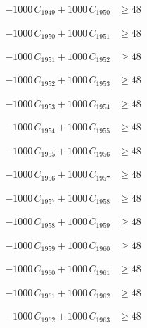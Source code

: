 \documentclass[a4paper,11pt]{article}
\begin{document}
\begin{align}
-1000\,C_{1949} + 1000\,C_{1950} &\geq 48 \nonumber
\end{align}

\begin{align}
-1000\,C_{1950} + 1000\,C_{1951} &\geq 48 \nonumber
\end{align}

\begin{align}
-1000\,C_{1951} + 1000\,C_{1952} &\geq 48 \nonumber
\end{align}

\begin{align}
-1000\,C_{1952} + 1000\,C_{1953} &\geq 48 \nonumber
\end{align}

\begin{align}
-1000\,C_{1953} + 1000\,C_{1954} &\geq 48 \nonumber
\end{align}

\begin{align}
-1000\,C_{1954} + 1000\,C_{1955} &\geq 48 \nonumber
\end{align}

\begin{align}
-1000\,C_{1955} + 1000\,C_{1956} &\geq 48 \nonumber
\end{align}

\begin{align}
-1000\,C_{1956} + 1000\,C_{1957} &\geq 48 \nonumber
\end{align}

\begin{align}
-1000\,C_{1957} + 1000\,C_{1958} &\geq 48 \nonumber
\end{align}

\begin{align}
-1000\,C_{1958} + 1000\,C_{1959} &\geq 48 \nonumber
\end{align}

\begin{align}
-1000\,C_{1959} + 1000\,C_{1960} &\geq 48 \nonumber
\end{align}

\begin{align}
-1000\,C_{1960} + 1000\,C_{1961} &\geq 48 \nonumber
\end{align}

\begin{align}
-1000\,C_{1961} + 1000\,C_{1962} &\geq 48 \nonumber
\end{align}

\begin{align}
-1000\,C_{1962} + 1000\,C_{1963} &\geq 48 \nonumber
\end{align}
\end{document}
